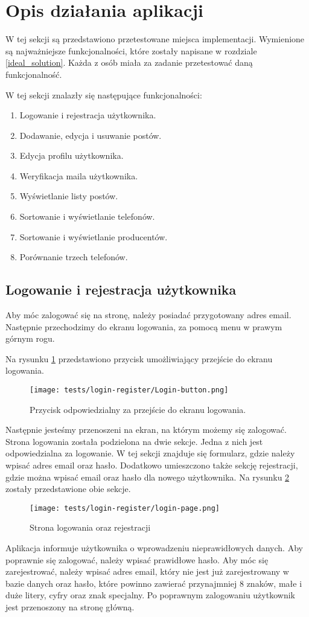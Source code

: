 \section{Opis działania aplikacji}
W tej sekcji są przedstawiono przetestowane miejsca implementacji. Wymienione są najważniejsze funkcjonalności, które zostały napisane w rozdziale \ref{ideal_solution}. Każda z osób miała za zadanie przetestować daną funkcjonalność.

W tej sekcji znalazły się następujące funkcjonalności:
\begin{enumerate}
  \item Logowanie i rejestracja użytkownika.
  \item Dodawanie, edycja i usuwanie postów.
  \item Edycja profilu użytkownika.
  \item Weryfikacja maila użytkownika.
  \item Wyświetlanie listy postów.
  \item Sortowanie i wyświetlanie telefonów.
  \item Sortowanie i wyświetlanie producentów.
  \item Porównanie trzech telefonów.
\end{enumerate}

\subsection{Logowanie i rejestracja użytkownika}
Aby móc zalogować się na stronę, należy posiadać przygotowany adres email. Następnie przechodzimy do ekranu logowania, za pomocą menu w prawym górnym rogu.

Na rysunku \ref{login_menu} przedstawiono przycisk umożliwiający przejście do ekranu logowania.
\begin{figure}[H]
  \centering
  \texttt{[image: tests/login-register/Login-button.png]}
  \caption{Przycisk odpowiedzialny za przejście do ekranu logowania.}
  \label{login_menu}
\end{figure}
Następnie jesteśmy przenoszeni na ekran, na którym możemy się zalogować. Strona logowania została podzielona na dwie sekcje. Jedna z nich jest odpowiedzialna za logowanie. W tej sekcji znajduje się formularz, gdzie należy wpisać adres email oraz hasło. Dodatkowo umieszczono także sekcję rejestracji, gdzie można wpisać email oraz hasło dla nowego użytkownika. Na rysunku \ref{login_page} zostały przedstawione obie sekcje.
\begin{figure}[H]
  \centering
  \texttt{[image: tests/login-register/login-page.png]}
  \caption{Strona logowania oraz rejestracji}
  \label{login_page}
\end{figure}
Aplikacja informuje użytkownika o wprowadzeniu nieprawidłowych danych. Aby poprawnie się zalogować, należy wpisać prawidłowe hasło. Aby móc się zarejestrować, należy wpisać adres email, który nie jest już zarejestrowany w bazie danych oraz hasło, które powinno zawierać przynajmniej 8 znaków, małe i duże litery, cyfry oraz znak specjalny. Po poprawnym zalogowaniu użytkownik jest przenoszony na stronę główną. 

